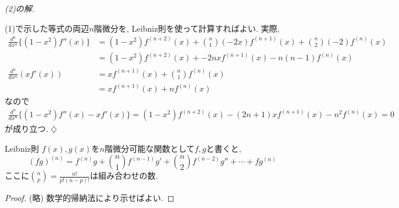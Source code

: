 \documentclass[titlepage]{jsarticle}
\numberwithin{equation}{section}
\newenvironment{kaitou}[1][解]{%
\begin{proofbox}%
\textit{#1. }\ignorespaces
}{%
\hfill$\diamondsuit$%
\end{proofbox}%
}
\begin{document}
\begin{kaitou}[(2)の解]
(1)で示した等式の両辺$n$階微分を, Leibniz則を使って計算すればよい. 実際,
\begin{align*}
\frac{d^n}{dx^n} \{(1-x^2)f''(x)\} &= (1-x^2)f^{(n+2)}(x) + \binom{n}{1}(-2x)f^{(n+1)}(x) + \binom{n}{2}(-2)f^{(n)}(x)\\
	&= (1-x^2)f^{(n+2)}(x) + -2nxf^{(n+1)}(x) - n(n-1)f^{(n)}(x)\\
\frac{d^n}{dx^n} \left(xf'(x)\right) &= xf^{(n+1)}(x) + \binom{n}{1}f^{(n)}(x) \\
	&= xf^{(n+1)}(x) + nf^{(n)}(x)
\end{align*}
なので
\begin{align*}
\frac{d^n}{dx^n} \{(1-x^2)f''(x)-xf'(x)\} = (1-x^2)f^{(n+2)}(x)-(2n+1)xf^{(n+1)}(x)-n^2f^{(n)}(x)=0
\end{align*}
が成り立つ.
\end{kaitou}

\begin{thm}{Leibniz則}{}
$f(x), g(x)$を$n$階微分可能な関数として$f,g$と書くと,
\[
(fg)^{(n)} = f^{(n)}g + \binom{n}{1}f^{(n-1)}g' + \binom{n}{2}f^{(n-2)}g'' + \cdots + fg^{(n)}
\]
ここに$\displaystyle{\binom{n}{p} = \frac{n!}{p!(n-p)!}}$は組み合わせの数.
\end{thm}
\begin{proof}
(略) 数学的帰納法により示せばよい.
\end{proof}
\end{document}
